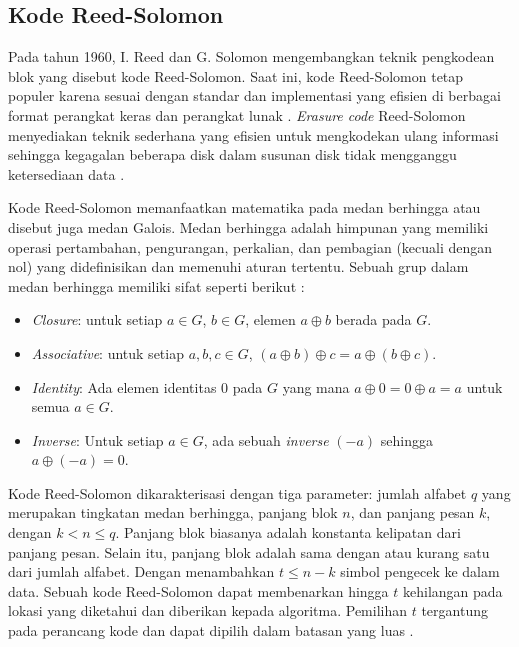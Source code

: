 \subsection{Kode Reed-Solomon}
\label{sec:kode-reed-solomon}

Pada tahun 1960, I. Reed dan G. Solomon mengembangkan teknik pengkodean blok yang disebut kode Reed-Solomon. Saat ini, kode Reed-Solomon tetap populer karena sesuai dengan standar dan implementasi yang efisien di berbagai format perangkat keras dan perangkat lunak \parencite{minio2022erasure}. \textit{Erasure code} Reed-Solomon menyediakan teknik sederhana yang efisien untuk mengkodekan ulang informasi sehingga kegagalan beberapa disk dalam susunan disk tidak mengganggu ketersediaan data \parencite{manasse2009reed}.

Kode Reed-Solomon memanfaatkan matematika pada medan berhingga atau disebut juga medan Galois. Medan berhingga adalah himpunan yang memiliki operasi pertambahan, pengurangan, perkalian, dan pembagian (kecuali dengan nol) yang didefinisikan dan memenuhi aturan tertentu. Sebuah grup dalam medan berhingga memiliki sifat seperti berikut 
\parencite{forney2005finitefields}:

\begin{itemize}
    \item \textit{Closure}: untuk setiap $a \in G$, $b \in G$, elemen $a \oplus b$ berada pada $G$.
    \item \textit{Associative}: untuk setiap $a,b,c \in G$, $(a \oplus b) \oplus c = a \oplus (b \oplus c)$.
    \item \textit{Identity}: Ada elemen identitas $0$ pada $G$ yang mana $a \oplus 0 = 0 \oplus a = a$ untuk semua $a \in G$.
    \item \textit{Inverse}: Untuk setiap $a \in G$, ada sebuah \textit{inverse} $(-a)$ sehingga $a \oplus (-a) = 0$.
\end{itemize}

Kode Reed-Solomon dikarakterisasi dengan tiga parameter: jumlah alfabet $q$ yang merupakan tingkatan medan berhingga, panjang blok $n$, dan panjang pesan $k$, dengan $k < n \le q$. Panjang blok biasanya adalah konstanta kelipatan dari panjang pesan. Selain itu, panjang blok adalah sama dengan atau kurang satu dari jumlah alfabet. Dengan menambahkan $t \le n - k$ simbol pengecek ke dalam data. Sebuah kode Reed-Solomon dapat membenarkan hingga $t$ kehilangan pada lokasi yang diketahui dan diberikan kepada algoritma. Pemilihan $t$ tergantung pada perancang kode dan dapat dipilih dalam batasan yang luas \parencite{riley2001introduction}.

